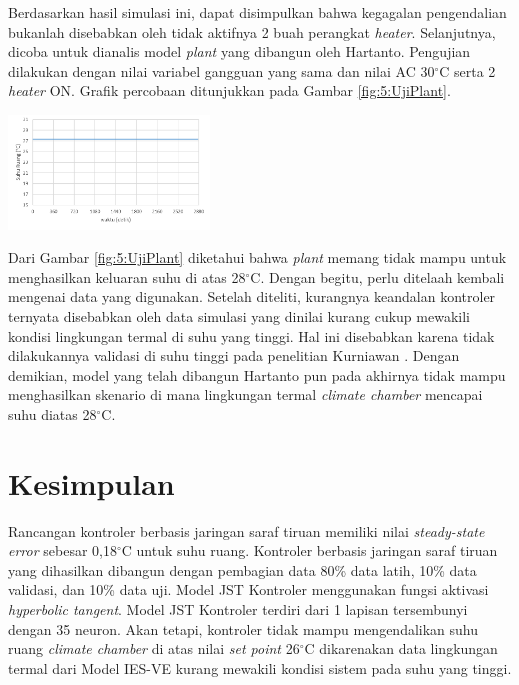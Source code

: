 \documentclass[a4paper,10pt]{article}
\makeatletter
\newenvironment{body}{\begin{multicols}{2}}{\end{multicols}}
\renewenvironment{figure}
{\def\@captype{figure}%
	\captionsetup{labelsep=period,format=hang,font=footnotesize,justification=justified}
}
{}
\makeatother
\begin{document}
\begin{body}
		Berdasarkan hasil simulasi ini, dapat disimpulkan bahwa kegagalan pengendalian bukanlah disebabkan oleh tidak aktifnya 2 buah perangkat \textit{heater}. Selanjutnya, dicoba untuk dianalis model \textit{plant} yang dibangun oleh Hartanto. Pengujian dilakukan dengan nilai variabel gangguan yang sama dan nilai AC 30$^\circ$C serta 2 \textit{heater} ON. Grafik percobaan ditunjukkan pada Gambar \ref{fig:5:UjiPlant}.
		
		\begin{figure}
			\centering
			\includegraphics[width=0.4\textwidth]{figures/UjiPlant}
			\caption{Grafik Hasil Uji \textit{Plant}}
			\label{fig:5:UjiPlant}
		\end{figure}
		
		\vspace{1mm}
		
		Dari Gambar \ref{fig:5:UjiPlant} diketahui bahwa \textit{plant} memang tidak mampu untuk menghasilkan keluaran suhu di atas 28$^\circ$C. Dengan begitu, perlu ditelaah kembali mengenai data yang digunakan. Setelah diteliti, kurangnya keandalan kontroler ternyata disebabkan oleh data simulasi yang dinilai kurang cukup mewakili kondisi lingkungan termal di suhu yang tinggi. Hal ini disebabkan karena tidak dilakukannya validasi di suhu tinggi pada penelitian Kurniawan \cite{skripsiIchfan}. Dengan demikian, model yang telah dibangun Hartanto pun pada akhirnya tidak mampu menghasilkan skenario di mana lingkungan termal \textit{climate chamber} mencapai suhu diatas 28$^\circ$C.\\
		
		\section{Kesimpulan}
		Rancangan kontroler berbasis jaringan saraf tiruan memiliki nilai \textit{steady-state error} sebesar 0,18$^\circ$C untuk suhu ruang. Kontroler berbasis jaringan saraf tiruan yang dihasilkan dibangun dengan pembagian data 80\% data latih, 10\% data validasi, dan 10\% data uji. Model JST Kontroler menggunakan fungsi aktivasi \textit{hyperbolic tangent}. Model JST Kontroler terdiri dari 1 lapisan tersembunyi dengan 35 neuron. Akan tetapi, kontroler tidak mampu mengendalikan suhu ruang \textit{climate chamber} di atas nilai \textit{set point} 26$^\circ$C dikarenakan data lingkungan termal dari Model IES-VE kurang mewakili kondisi sistem pada suhu yang tinggi.\\
		

\end{body}
\end{document}
